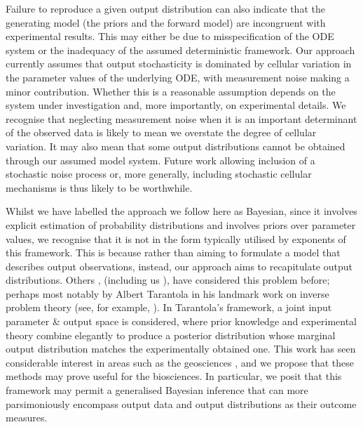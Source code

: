 Failure to reproduce a given output distribution can also indicate that the generating model (the priors and the forward model) are incongruent with experimental results. This may either be due to misspecification of the ODE system or the inadequacy of the assumed deterministic framework. Our approach currently assumes that output stochasticity is dominated by cellular variation in the parameter values of the underlying ODE, with measurement noise making a minor contribution. Whether this is a reasonable assumption depends on the system under investigation and, more importantly, on experimental details. We recognise that neglecting measurement noise when it is an important determinant of the observed data is likely to mean we overstate the degree of cellular variation. It may also mean that some output distributions cannot be obtained through our assumed model system. Future work allowing inclusion of a stochastic noise process or, more generally, including stochastic cellular mechanisms is thus likely to be worthwhile.

Whilst we have labelled the approach we follow here as Bayesian, since it involves explicit estimation of probability distributions and involves priors over parameter values, we recognise that it is not in the form typically utilised by exponents of this framework. This is because rather than aiming to formulate a model that describes output observations, instead, our approach aims to recapitulate output distributions. Others \cite{butler2014measure}, (including us \cite{lambert2018inverse}), have considered this problem before; perhaps most notably by Albert Tarantola in his landmark work on inverse problem theory (see, for example, \cite{tarantola2005inverse}). In Tarantola's framework, a joint input parameter \& output space is considered, where prior knowledge and experimental theory combine elegantly to produce a posterior distribution whose marginal output distribution matches the experimentally obtained one. This work has seen considerable interest in areas such as the geosciences \cite{mosegaard1995monte,vukicevic2008analysis}, and we propose that these methods may prove useful for the biosciences. In particular, we posit that this framework may permit a generalised Bayesian inference that can more parsimoniously encompass output data and output distributions as their outcome measures.

